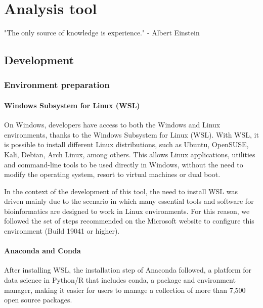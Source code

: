 \chapter{Analysis tool}
\label{chapter:Analysis tool}

\begin{introduction}
    "The only source of knowledge is experience." - Albert Einstein
\end{introduction}



\section{Development}
\subsection{Environment preparation }
\subsubsection{\textbf{Windows Subsystem for Linux (WSL)}}

On Windows, developers have access to both the Windows and Linux environments, thanks to the Windows Subsystem for Linux (WSL). With WSL, it is possible to install different Linux distributions, such as Ubuntu, OpenSUSE, Kali, Debian, Arch Linux, among others. This allows Linux applications, utilities and command-line tools to be used directly in Windows, without the need to modify the operating system, resort to virtual machines or dual boot. 

In the context of the development of this tool, the need to install WSL was driven mainly due to the scenario in which many essential tools and software for bioinformatics are designed to work in Linux environments. For this reason, we followed the set of steps recommended on the Microsoft website to configure this environment (Build 19041 or higher). %

\subsubsection{\textbf{Anaconda and Conda}}

After installing WSL, the installation step of Anaconda followed, a platform for data science in Python/R that includes conda, a package and environment manager, making it easier for users to manage a collection of more than 7,500 open source packages. %

